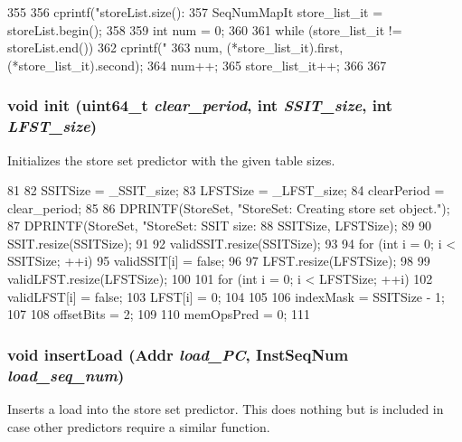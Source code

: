 \begin{DoxyCode}
355 {
356     cprintf("storeList.size(): %
357     SeqNumMapIt store_list_it = storeList.begin();
358 
359     int num = 0;
360 
361     while (store_list_it != storeList.end()) {
362         cprintf("%
363                 num, (*store_list_it).first, (*store_list_it).second);
364         num++;
365         store_list_it++;
366     }
367 }
\end{DoxyCode}
\hypertarget{classStoreSet_a4976b4794b30eada21534d7238044c68}{
\subsubsection[{init}]{\setlength{\rightskip}{0pt plus 5cm}void init (uint64\_\-t {\em clear\_\-period}, \/  int {\em SSIT\_\-size}, \/  int {\em LFST\_\-size})}}
\label{classStoreSet_a4976b4794b30eada21534d7238044c68}
Initializes the store set predictor with the given table sizes. 


\begin{DoxyCode}
81 {
82     SSITSize = _SSIT_size;
83     LFSTSize = _LFST_size;
84     clearPeriod = clear_period;
85 
86     DPRINTF(StoreSet, "StoreSet: Creating store set object.\n");
87     DPRINTF(StoreSet, "StoreSet: SSIT size: %
88             SSITSize, LFSTSize);
89 
90     SSIT.resize(SSITSize);
91 
92     validSSIT.resize(SSITSize);
93 
94     for (int i = 0; i < SSITSize; ++i)
95         validSSIT[i] = false;
96 
97     LFST.resize(LFSTSize);
98 
99     validLFST.resize(LFSTSize);
100 
101     for (int i = 0; i < LFSTSize; ++i) {
102         validLFST[i] = false;
103         LFST[i] = 0;
104     }
105 
106     indexMask = SSITSize - 1;
107 
108     offsetBits = 2;
109 
110     memOpsPred = 0;
111 }
\end{DoxyCode}
\hypertarget{classStoreSet_a205cc846bfa1f976cf2ca9f4bd0fd226}{
\subsubsection[{insertLoad}]{\setlength{\rightskip}{0pt plus 5cm}void insertLoad ({\bf Addr} {\em load\_\-PC}, \/  {\bf InstSeqNum} {\em load\_\-seq\_\-num})}}
\label{classStoreSet_a205cc846bfa1f976cf2ca9f4bd0fd226}
Inserts a load into the store set predictor. This does nothing but is included in case other predictors require a similar function. 


